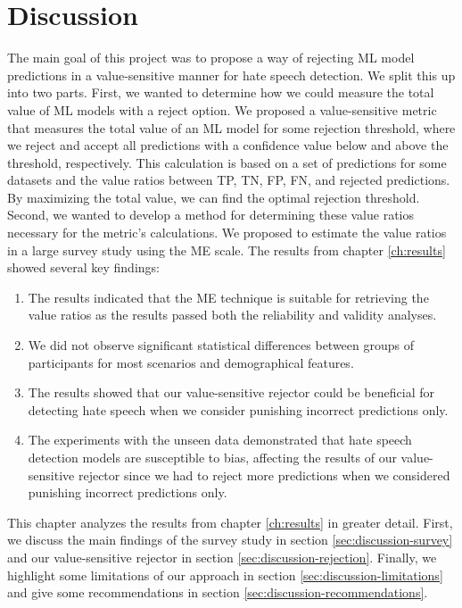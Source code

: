 \chapter{Discussion}
The main goal of this project was to propose a way of rejecting ML model predictions in a value-sensitive manner for hate speech detection.
%
We split this up into two parts.
%
First, we wanted to determine how we could measure the total value of ML models with a reject option.
%
We proposed a value-sensitive metric that measures the total value of an ML model for some rejection threshold, where we reject and accept all predictions with a confidence value below and above the threshold, respectively.
%
This calculation is based on a set of predictions for some datasets and the value ratios between TP, TN, FP, FN, and rejected predictions.
%
By maximizing the total value, we can find the optimal rejection threshold.
%
Second, we wanted to develop a method for determining these value ratios necessary for the metric's calculations.
%
We proposed to estimate the value ratios in a large survey study using the ME scale.
%
The results from chapter \ref{ch:results} showed several key findings:
\begin{enumerate}
    \item The results indicated that the ME technique is suitable for retrieving the value ratios as the results passed both the reliability and validity analyses.
    \item We did not observe significant statistical differences between groups of participants for most scenarios and demographical features.
    \item The results showed that our value-sensitive rejector could be beneficial for detecting hate speech when we consider punishing incorrect predictions only.
    \item The experiments with the unseen data demonstrated that hate speech detection models are susceptible to bias, affecting the results of our value-sensitive rejector since we had to reject more predictions when we considered punishing incorrect predictions only.
\end{enumerate}
%

%
This chapter analyzes the results from chapter \ref{ch:results} in greater detail.
%
First, we discuss the main findings of the survey study in section \ref{sec:discussion-survey} and our value-sensitive rejector in section \ref{sec:discussion-rejection}.
%
Finally, we highlight some limitations of our approach in section \ref{sec:discussion-limitations} and give some recommendations in section \ref{sec:discussion-recommendations}.


